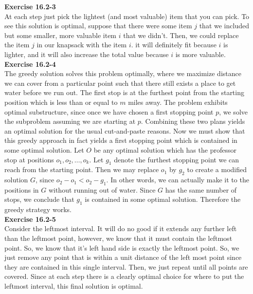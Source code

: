 \documentclass{article}
\begin{document}
\noindent\textbf{Exercise 16.2-3}\\

At each step just pick the lightest (and most valuable) item that you can pick. To see this solution is optimal, suppose that there were some item $j$ that we included but some smaller, more valuable item $i$ that we didn't. Then, we could replace the item $j$ in our knapsack with the item $i$. it will definitely fit because $i$ is lighter, and it will also increase the total value because $i$ is more valuable.\\

\noindent\textbf{Exercise 16.2-4}\\

The greedy solution solves this problem optimally, where we maximize distance we can cover from a particular point such that there still exists a place to get water before we run out.  The first stop is at the furthest point from the starting position which is less than or equal to $m$ miles away.  The problem exhibits optimal substructure, since once we have chosen a first stopping point $p$, we solve the subproblem assuming we are starting at $p$.  Combining these two plans yields an optimal solution for the usual cut-and-paste reasons.  Now we must show that this greedy approach in fact yields a first stopping point which is contained in some optimal solution.  Let $O$ be any optimal solution which has the professor stop at positions $o_1, o_2, \ldots, o_k$.  Let $g_1$ denote the furthest stopping point we can reach from the starting point.  Then we may replace $o_1$ by $g_2$ to create a modified solution $G$, since $o_2 - o_1 < o_2 - g_1$. In other words, we can actually make it to the positions in $G$ without running out of water.  Since $G$ has the same number of stops, we conclude that $g_1$ is contained in some optimal solution.  Therefore the greedy strategy works. \\

\noindent\textbf{Exercise 16.2-5}\\

Consider the leftmost interval. It will do no good if it extends any further left than the leftmost point, however, we know that it must contain the leftmost point. So, we know that it's left hand side is exactly the leftmost point. So, we just remove any point that is within a unit distance of the left most point since they are contained in this single interval. Then, we just repeat until all points are covered. Since at each step there is a clearly optimal choice for where to put the leftmost interval, this final solution is optimal.\\
\end{document}
